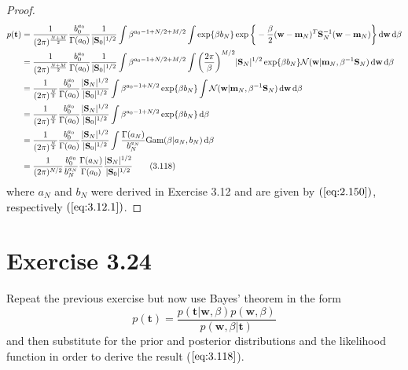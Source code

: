 \begin{proof}
\begin{align*}
        p(\mathbf{t}) 
        &= \frac{1}{(2\pi)^{\frac{N + M}{2}}}\frac{b_0^{a_0}}{\Gamma(a_0)}
         \frac{1}{|\mathbf{S}_0|^{1/2}} 
        \int \beta^{a_0 - 1 + N/2 + M/2} 
        \int \exp{\beta b_N}\exp\bigg\{-\frac{\beta}{2}(\mathbf{w} 
            - \mathbf{m}_N)^T\mathbf{S}_N^{-1}
            (\mathbf{w} - \mathbf{m}_N)\bigg\} \diff \mathbf{w} \diff \beta \\
        &= \frac{1}{(2\pi)^{\frac{N + M}{2}}}\frac{b_0^{a_0}}{\Gamma(a_0)}
         \frac{1}{|\mathbf{S}_0|^{1/2}} 
        \int \beta^{a_0 - 1+ N/2 + M/2} 
        \int \bigg(\frac{2\pi}{\beta}\bigg)^{M/2} |\mathbf{S}_N|^{1/2}  
        \exp\{\beta b_N\}
        \mathcal{N}(\mathbf{w} | \mathbf{m}_N, \beta^{-1}\mathbf{S}_N)
        \diff \mathbf{w} \diff \beta \\
        &= \frac{1}{(2\pi)^{\frac{N}{2}}}\frac{b_0^{a_0}}{\Gamma(a_0)}
        \frac{|\mathbf{S}_N|^{1/2}}{|\mathbf{S}_0|^{1/2}} 
        \int \beta^{a_0 - 1 + N/2} 
        \exp\{\beta b_N\}
        \int\mathcal{N}(\mathbf{w} | \mathbf{m}_N, \beta^{-1}\mathbf{S}_N)
        \diff \mathbf{w} \diff \beta \\
        &= \frac{1}{(2\pi)^{\frac{N}{2}}}\frac{b_0^{a_0}}{\Gamma(a_0)}
        \frac{|\mathbf{S}_N|^{1/2}}{|\mathbf{S}_0|^{1/2}} 
        \int \beta^{a_0 - 1 + N/2} 
        \exp\{\beta b_N\} \diff \beta \\
        &= \frac{1}{(2\pi)^{\frac{N}{2}}}\frac{b_0^{a_0}}{\Gamma(a_0)}
        \frac{|\mathbf{S}_N|^{1/2}}{|\mathbf{S}_0|^{1/2}} 
        \int\frac{\Gamma(a_N)}{b_N^{a_N}} \text{Gam}(\beta | a_N, b_N) \diff \beta \\
        &= \frac{1}{(2\pi)^{N / 2}} \frac{b_0^{a_0}}{b_N^{a_N}}
        \frac{\Gamma(a_N)}{\Gamma(a_0)} \frac{|\mathbf{S}_N|^{1/2}}{|\mathbf{S}_0|^{1/2}}
        \tag{3.118}
    \end{align*}
    where $a_N$ and $b_N$ were derived in Exercise 3.12 and are
    given by $(\ref{eq:2.150})$, respectively $(\ref{eq:3.12.1})$.
\end{proof}

\section*{Exercise 3.24}
Repeat the previous exercise but now use Bayes' theorem in 
the form
\begin{equation}\label{eq:3.119}\tag{3.119}
    p(\mathbf{t}) 
    = \frac{p(\mathbf{t} | \mathbf{w}, \beta)p(\mathbf{w}, \beta)}
        {p(\mathbf{w}, \beta | \mathbf{t})}
\end{equation}
and then substitute for the prior and posterior distributions and 
the likelihood function in order to derive the result ($\ref{eq:3.118}$).


